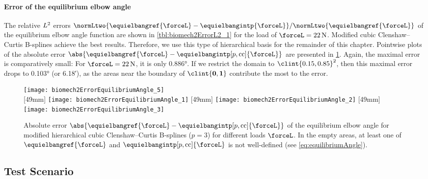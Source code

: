 \pagebreak

\paragraph{Error of the equilibrium elbow angle}

The relative $L^2$ errors
$\normLtwo{\equielbangref{\forceL} - \equielbangintp{\forceL}}/
\normLtwo{\equielbangref{\forceL}}$
of the equilibrium elbow angle function are shown in
\cref{tbl:biomech2ErrorL2_1} for the load of
$\forceL = \SI{22}{\newton}$.
Modified cubic Clenshaw--Curtis B-splines achieve the best results.
Therefore, we use this type of hierarchical basis
for the remainder of this chapter.
Pointwise plots of the absolute error
$\abs{\equielbangref{\forceL} - \equielbangintp[p,\cc]{\forceL}}$
are presented in \cref{fig:biomech2ErrorEquilibriumAngle}.
Again, the maximal error is comparatively small:
For $\forceL = \SI{22}{\newton}$, it is only \ang{0.886}.
If we restrict the domain to $\clint{0.15, 0.85}^2$,
then this maximal error drops to \ang{0.103} (or \ang{;6.18;}),
as the areas near the boundary of $\clint{\*0, \*1}$
contribute the most to the error.

\begin{figure}
  \texttt{[image: biomech2ErrorEquilibriumAngle\_5]}%
  \\[2mm]%
  [49mm]{%
    \texttt{[image: biomech2ErrorEquilibriumAngle\_1]}%
  }%
  \hfill%
  [49mm]{%
    \texttt{[image: biomech2ErrorEquilibriumAngle\_2]}%
  }%
  \hfill%
  [49mm]{%
    \texttt{[image: biomech2ErrorEquilibriumAngle\_3]}%
  }%
  \caption[Absolute error of the equilibrium elbow angle]{%
    Absolute error
    $\abs{\equielbangref{\forceL} - \equielbangintp[p,\cc]{\forceL}}$
    of the equilibrium elbow angle for
    modified hierarchical cubic Clenshaw--Curtis B-splines ($p = 3$)
    for different loads $\forceL$.
    In the empty areas, at least one of
    $\equielbangref{\forceL}$ and $\equielbangintp[p,\cc]{\forceL}$
    is not well-defined (see \cref{eq:equilibriumAngle}).%
  }%
  \label{fig:biomech2ErrorEquilibriumAngle}%
\end{figure}



\subsection{Test Scenario}
\label{sec:734scenario}

